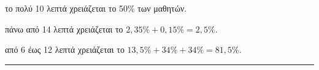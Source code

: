 \begin{alist}
\begin{rlist}
\item το πολύ 10 λεπτά χρειάζεται το 50\% των μαθητών.
\item πάνω από 14 λεπτά χρειάζεται το $2,35\% + 0,15\% = 2,5\%$.
\item από 6 έως 12 λεπτά χρειάζεται το $13,5\% + 34\% + 34\% = 81,5\%$.
\end{rlist}
\end{alist}
\vspace{6mm}
\noindent\rule{\textwidth}{0.4pt}
\vspace{6mm}

